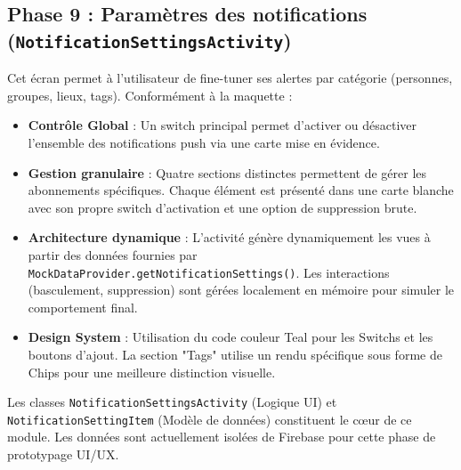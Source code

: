 \documentclass{article}
\begin{document}
\subsection{Phase 9 : Paramètres des notifications (\texttt{NotificationSettingsActivity})}
Cet écran permet à l'utilisateur de fine-tuner ses alertes par catégorie (personnes, groupes, lieux, tags). Conformément à la maquette :
\begin{itemize}
    \item \textbf{Contrôle Global} : Un switch principal permet d'activer ou désactiver l'ensemble des notifications push via une carte mise en évidence.
    \item \textbf{Gestion granulaire} : Quatre sections distinctes permettent de gérer les abonnements spécifiques. Chaque élément est présenté dans une carte blanche avec son propre switch d'activation et une option de suppression brute.
    \item \textbf{Architecture dynamique} : L'activité génère dynamiquement les vues à partir des données fournies par \texttt{MockDataProvider.getNotificationSettings()}. Les interactions (basculement, suppression) sont gérées localement en mémoire pour simuler le comportement final.
    \item \textbf{Design System} : Utilisation du code couleur Teal pour les Switchs et les boutons d'ajout. La section "Tags" utilise un rendu spécifique sous forme de Chips pour une meilleure distinction visuelle.
\end{itemize}
Les classes \texttt{NotificationSettingsActivity} (Logique UI) et \texttt{NotificationSettingItem} (Modèle de données) constituent le cœur de ce module. Les données sont actuellement isolées de Firebase pour cette phase de prototypage UI/UX.
\end{document}
